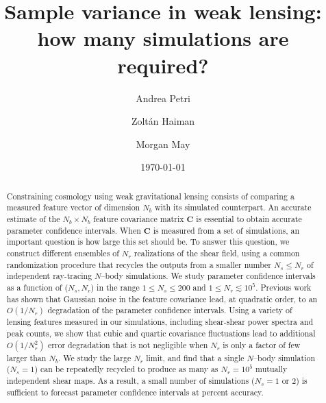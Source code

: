 \documentclass[reprint,aps,prd,superscriptaddress,showkeys,showpacs]{revtex4-1}
\newcommand{\bb}[1]{\mathbf{#1}}
\begin{document}
\title{Sample variance in weak lensing: how many simulations are required?}

\author{Andrea Petri}

\author{Zolt\'an Haiman}

\author{Morgan May}

\date{\today}

\label{firstpage}

\begin{abstract}

Constraining cosmology using weak gravitational lensing consists of
comparing a measured feature vector of dimension $N_b$ with its
simulated counterpart. An accurate estimate of the $N_b\times N_b$
feature covariance matrix $\bb{C}$ is essential to obtain accurate
parameter confidence intervals. When $\bb{C}$ is measured from a set
of simulations, an important question is how large this set should
be. To answer this question, we construct different ensembles of $N_r$
realizations of the shear field, using a common randomization
procedure that recycles the outputs from a smaller number $N_s\leq
N_r$ of independent ray-tracing $N$--body simulations.  We study
parameter confidence intervals as a function of ($N_s,N_r$) in the
range $1\leq N_s\leq 200$ and $1\leq N_r\lesssim 10^5$.  Previous work
\citep{DodelsonSchneider13} has shown that Gaussian noise in the
feature covariance lead, at quadratic order, to an $O(1/N_r)$
degradation of the parameter confidence intervals. Using a variety of
lensing features measured in our simulations, including shear-shear
power spectra and peak counts, we show that cubic and quartic
covariance fluctuations lead to additional $O(1/N_r^2)$ error
degradation that is not negligible when $N_r$ is only a factor of few
larger than $N_b$. We study the large $N_r$ limit, and find that a
single $N$--body simulation ($N_s=1$) can be repeatedly recycled to
produce as many as $N_r=10^5$ mutually independent shear maps. As a
result, a small number of simulations ($N_s=1$ or $2$) is sufficient
to forecast parameter confidence intervals at percent
accuracy. 

\end{abstract}
\end{document}
